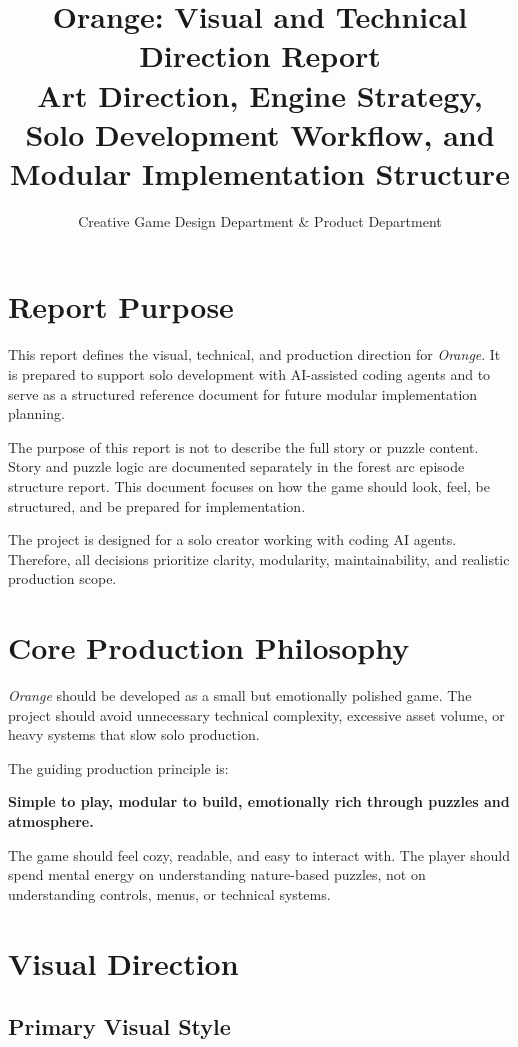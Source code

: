 \documentclass[12pt]{article}
\title{\textbf{Orange: Visual and Technical Direction Report}\\
\large Art Direction, Engine Strategy, Solo Development Workflow, and Modular Implementation Structure}
\author{Creative Game Design Department \& Product Department}
\date{}
\begin{document}
\maketitle

\section{Report Purpose}

This report defines the visual, technical, and production direction for \textit{Orange}. It is prepared to support solo development with AI-assisted coding agents and to serve as a structured reference document for future modular implementation planning.

The purpose of this report is not to describe the full story or puzzle content. Story and puzzle logic are documented separately in the forest arc episode structure report. This document focuses on how the game should look, feel, be structured, and be prepared for implementation.

The project is designed for a solo creator working with coding AI agents. Therefore, all decisions prioritize clarity, modularity, maintainability, and realistic production scope.

\section{Core Production Philosophy}

\textit{Orange} should be developed as a small but emotionally polished game. The project should avoid unnecessary technical complexity, excessive asset volume, or heavy systems that slow solo production.

The guiding production principle is:

\begin{center}
\textbf{Simple to play, modular to build, emotionally rich through puzzles and atmosphere.}
\end{center}

The game should feel cozy, readable, and easy to interact with. The player should spend mental energy on understanding nature-based puzzles, not on understanding controls, menus, or technical systems.

\section{Visual Direction}

\subsection{Primary Visual Style}
\end{document}
